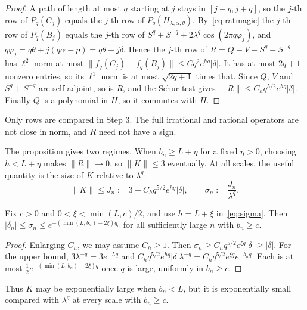 \begin{proof}
A path of length at most $q$ starting at $j$ stays in $[j-q,j+q]$, so the $j$-th row of $P_q(C_j)$ equals the $j$-th row of $P_q(H_{\lambda,\alpha,\theta})$. By~\eqref{eq:ratmagic} the $j$-th row of $P_q(B_j)$ equals the $j$-th row of $S^q+S^{-q}+2\lambda^q\cos(2\pi q\varphi_j)$, and $q\varphi_j=q\theta+j(q\alpha-p)=q\theta+j\delta$. Hence the $j$-th row of $R=Q-V-S^q-S^{-q}$ has $\ell^2$ norm at most $\|f_q(C_j)-f_q(B_j)\|\le Cq^2e^{hq}|\delta|$. It has at most $2q+1$ nonzero entries, so its $\ell^1$ norm is at most $\sqrt{2q+1}$ times that. Since $Q$, $V$ and $S^q+S^{-q}$ are self-adjoint, so is $R$, and the Schur test gives $\|R\|\le C_hq^{5/2}e^{hq}|\delta|$. Finally $Q$ is a polynomial in $H$, so it commutes with $H$.
\end{proof}

Only rows are compared in Step 3. The full irrational and rational operators are not close in norm, and $R$ need not have a sign.

The proposition gives two regimes. When $b_n\ge L+\eta$ for a fixed $\eta>0$, choosing $h<L+\eta$ makes $\|R\|\to0$, so $\|K\|\le3$ eventually. At all scales, the useful quantity is the size of $K$ relative to $\lambda^q$:
\begin{equation}\label{eq:sigma}
\|K\|\le J_n:=3+C_hq^{5/2}e^{hq}|\delta|,\qquad \sigma_n:=\frac{J_n}{\lambda^{q}}.
\end{equation}
\begin{lemma}\label{lem:sigma}
Fix $c>0$ and $0<\xi<\min(L,c)/2$, and use $h=L+\xi$ in~\eqref{eq:sigma}. Then $|\delta_n|\le\sigma_n\le e^{-(\min(L,b_n)-2\xi)q_n}$ for all sufficiently large $n$ with $b_n\ge c$.
\end{lemma}

\begin{proof}
Enlarging $C_h$, we may assume $C_h\ge1$. Then $\sigma_n\ge C_hq^{5/2}e^{\xi q}|\delta|\ge|\delta|$. For the upper bound, $3\lambda^{-q}=3e^{-Lq}$ and $C_hq^{5/2}e^{hq}|\delta|\lambda^{-q}=C_hq^{5/2}e^{\xi q}e^{-b_nq}$. Each is at most $\frac12e^{-(\min(L,b_n)-2\xi)q}$ once $q$ is large, uniformly in $b_n\ge c$.
\end{proof}

Thus $K$ may be exponentially large when $b_n<L$, but it is exponentially small compared with $\lambda^q$ at every scale with $b_n\ge c$.
